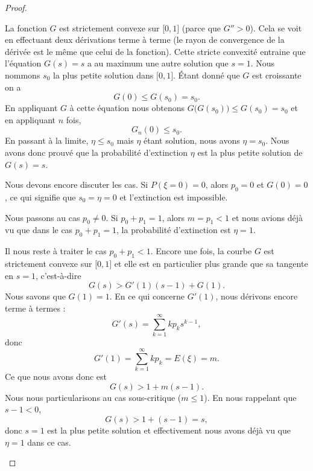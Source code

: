 \begin{proof}
\begin{subproof}
		La fonction \( G\) est strictement convexe sur \( \mathopen[ 0 , 1 \mathclose]\) (parce que \( G''>0\)). Cela se voit en effectuant deux dérivations terme à terme (le rayon de convergence de la dérivée est le même que celui de la fonction). Cette stricte convexité entraine que l'équation \( G(s)=s\) a au maximum une autre solution que \( s=1\). Nous nommons \( s_0\) la plus petite solution dans \( \mathopen[ 0 , 1 \mathclose]\). Étant donné que \( G\) est croissante on a
		\begin{equation}
			G(0)\leq G(s_0)=s_0.
		\end{equation}
		En appliquant \( G\) à cette équation nous obtenons \( G\big( G(s_0) \big)\leq G(s_0)=s_0\) et en appliquant \( n\) fois,
		\begin{equation}
			G_n(0)\leq s_0.
		\end{equation}
		En passant à la limite, \( \eta\leq s_0\) mais \( \eta\) étant solution, nous avons \( \eta=s_0\). Nous avons donc prouvé que la probabilité d'extinction \( \eta\) est la plus petite solution de \( G(s)=s\).


		Nous devons encore discuter les cas. Si \( P(\xi=0)=0\), alors \( p_0=0\) et \( G(0)=0\), ce qui signifie que \( s_0=\eta=0\) et l'extinction est impossible.

		Nous passons au cas \( p_0\neq 0\). Si \( p_0+p_1=1\), alors \( m=p_1<1\) et nous avions déjà vu que dans le cas \( p_0+p_1=1\), la probabilité d'extinction est \( \eta=1\).

		Il nous reste à traiter le cas \( p_0+p_1<1\). Encore une fois, la courbe \( G\) est strictement convexe sur \( \mathopen[ 0 , 1 \mathclose]\) et elle est en particulier plus grande que sa tangente en \( s=1\), c'est-à-dire
		\begin{equation}
			G(s)>G'(1)(s-1)+G(1).
		\end{equation}
		Nous savons que \( G(1)=1\). En ce qui concerne \( G'(1)\), nous dérivons encore terme à termes :
		\begin{equation}
			G'(s)=\sum_{k=1}^{\infty}kp_ks^{k-1},
		\end{equation}
		donc
		\begin{equation}
			G'(1)=\sum_{k=1}^{\infty}kp_k=E(\xi)=m.
		\end{equation}
		Ce que nous avons donc est
		\begin{equation}
			G(s)>1+m(s-1).
		\end{equation}
		Nous nous particularisons au cas sous-critique (\( m\leq 1\)). En nous rappelant que \( s-1<0\),
		\begin{equation}
			G(s)>1+(s-1)=s,
		\end{equation}
		donc \( s=1\) est la plus petite solution et effectivement nous avons déjà vu que \( \eta=1\) dans ce cas.


\end{subproof}
\end{proof}

